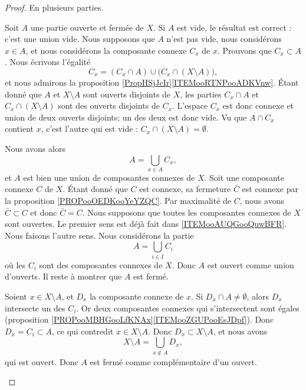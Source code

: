 \begin{proof}
	En plusieurs parties.
	\begin{subproof}
		Soit \( A\) une partie ouverte et fermée de \( X\). Si \( A\) est vide, le résultat est correct : c'est une union vide. Nous supposons que \( A\) n'est pas vide, nous considérons \( x\in A\), et nous considérons la composante connexe \( C_x\) de \( x\). Prouvons que \( C_x\subset A\). Nous écrivons l'égalité
		\begin{equation}
			C_x=(C_x\cap A)\cup\big( C_x\cap(X\setminus A) \big),
		\end{equation}
		et nous admirons la proposition \ref{PropHSjJcIr}\ref{ITEMooRTNPooADKVnw}. Étant donné que \( A\) et \( X\setminus A\) sont ouverts disjoints de \( X\), les parties \( C_x\cap A\) et \( C_x\cap(X\setminus A)\) sont des ouverts disjoints de \( C_x\). L'espace \( C_x\) est donc connexe et union de deux ouverts disjoints; un des deux est donc vide. Vu que \( A\cap C_x\) contient \( x\), c'est l'autre qui est vide : \( C_x\cap(X\setminus A)=\emptyset\).

		Nous avons alors
		\begin{equation}
			A=\bigcup_{x\in A}C_x,
		\end{equation}
		et \( A\) est bien une union de composantes connexes de \( X\).
		Soit une composante connexe \( C\) de \( X\). Étant donné que \( C\) est connexe, sa fermeture \( \bar C\) est connexe par la proposition \ref{PROPooOEDKooYeYZQC}. Par maximalité de \( C\), nous avons \( \bar C\subset C\) et donc \( \bar C=C\).
		Nous supposons que toutes les composantes connexes de \( X\) sont ouvertes. Le premier sens est déjà fait dans \ref{ITEMooAUQGooQuwBFR}. Nous faisons l'autre sens. Nous considérons la partie
		\begin{equation}
			A=\bigcup_{i\in I}C_i
		\end{equation}
		où les \( C_i\) sont des composantes connexes de \( X\). Donc \( A\) est ouvert comme union d'ouverts. Il reste à montrer que \( A\) est fermé.

		Soient \( x\in X\setminus A\), et \( D_x\) la composante connexe de \( x\). Si \( D_x\cap A\neq\emptyset\), alors \( D_x\) intersecte un des \( C_i\). Or deux composantes connexes qui s'intersectent sont égales (proposition \ref{PROPooMBHGooLfKNAx}\ref{ITEMooZGUPooEsJDpf}). Donc \( D_x=C_i\subset A\), ce qui contredit \( x\in X\setminus A\). Donc \( D_x\subset X\setminus A\), et nous avons
		\begin{equation}
			X\setminus A=\bigcup_{x\not\in A}D_x,
		\end{equation}
		qui est ouvert. Donc \( A\) est fermé comme complémentaire d'un ouvert.
	\end{subproof}
\end{proof}


